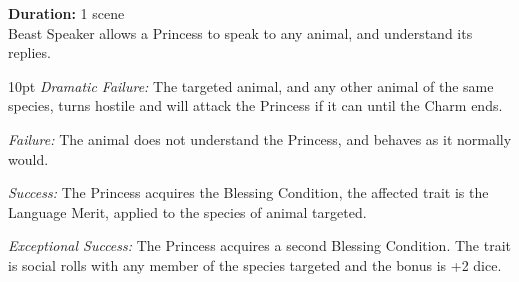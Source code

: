 \noindent \textbf{Duration:} 1 scene \\

\noindent Beast Speaker allows a Princess to speak to any animal, and understand its replies.

\begin{myindentpar}{10pt}    \emph{Dramatic Failure:} The targeted animal, and any other animal of the same species, turns hostile and will attack the Princess if it can until the Charm ends.

    \emph{Failure:} The animal does not understand the Princess, and behaves as it normally would.

    \emph{Success:} The Princess acquires the Blessing Condition, the affected trait is the Language Merit, applied to the species of animal targeted. 

    \emph{Exceptional Success:} The Princess acquires a second Blessing Condition. The trait is social rolls with any member of the species targeted and the bonus is +2 dice. \end{myindentpar}
    







